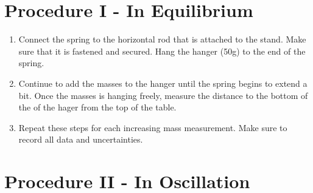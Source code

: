 

{}

\section{{Procedure I - In Equilibrium}}

{}

\begin{enumerate}
	\item {Connect the spring to the horizontal rod that is attached to the stand. Make sure that it is fastened and secured. Hang the hanger (50g) to the end of the spring.}
	\item {Continue to add the masses to the hanger until the spring begins to extend a bit. Once the masses is hanging freely, measure the distance to the bottom of the of the hager from the top of the table.}
	\item {Repeat these steps for each increasing mass measurement. Make sure to record all data and uncertainties.}
\end{enumerate}

\section{{Procedure II - In Oscillation}}

{}

